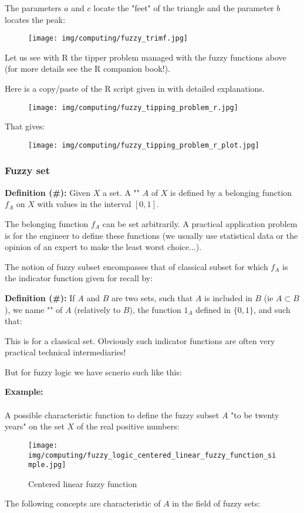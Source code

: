 	The parameters $a$ and $c$ locate the "feet" of the triangle and the parameter $b$ locates the peak:
	\begin{figure}[H]
		\centering
		\texttt{[image: img/computing/fuzzy\_trimf.jpg]}
	\end{figure}
	Let us see with R the tipper problem managed with the fuzzy functions above (for more details see the R companion book!).
	
	\begin{tcolorbox}[colframe=black,colback=white,sharp corners]
	Here is a copy/paste of the R script  given in \cite{wagner2011fuzzy} with detailed explanations.
	\begin{figure}[H]
		\centering
		\texttt{[image: img/computing/fuzzy\_tipping\_problem\_r.jpg]}
	\end{figure}
	That gives:
	\begin{figure}[H]
		\centering
		\texttt{[image: img/computing/fuzzy\_tipping\_problem\_r\_plot.jpg]}
	\end{figure}
	\end{tcolorbox}
	
	\subsubsection{Fuzzy set}
	\textbf{Definition (\#\mydef):} Given $X$ a set. A "" $A$ of $X$ is defined by a belonging function $f_A$ on $X$ with values in the interval $[0,1]$.
	\begin{tcolorbox}[title=Remark,colframe=black,arc=10pt]
	The belonging function $f_A$ can be set arbitrarily. A practical application problem is for the engineer to define these functions (we usually use statistical data or the opinion of an expert to make the least worst choice...).
	\end{tcolorbox}
	The notion of fuzzy subset encompasses that of classical subset for which $f_A$ is the indicator function given for recall by:
	
	\textbf{Definition (\#\mydef):} If $A$ and $B$ are two sets, such that $A$ is included in $B$ (ie $A\subset B$), we name "" of $A$ (relatively to $B$), the function $1_A$ defined in $\{0,1\}$, and such that:
	
	This is for a classical set. Obviously such indicator functions are often very practical technical intermediaries!
	
	But for fuzzy logic we have scnerio such like this:
	\begin{tcolorbox}[colframe=black,colback=white,sharp corners]
	\textbf{{\Large {}}Example:}\\\\
	A possible characteristic function to define the fuzzy subset $A$ "to be twenty years" on the set $X$ of the real positive numbers:
	\begin{figure}[H]
		\centering
		\texttt{[image: img/computing/fuzzy\_logic\_centered\_linear\_fuzzy\_function\_simple.jpg]}
		\caption{Centered linear fuzzy function}
	\end{figure}
	\end{tcolorbox}
	The following concepts are characteristic of $A$ in the field of fuzzy sets:
	
